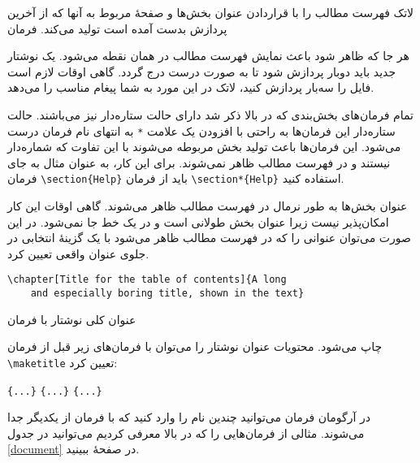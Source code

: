 لاتک فهرست مطالب را با قراردادن عنوان بخش‌ها و صفحهٔ مربوط به آنها که از آخرین پردازش بدست آمده است تولید می‌کند. فرمان
\begin{lscommand} 
\end{lscommand} 
\noindent
هر جا که ظاهر شود باعث نمایش فهرست مطالب در همان نقطه می‌شود. یک نوشتار جدید باید دوبار پردازش شود تا 
به صورت درست درج گردد. گاهی اوقات لازم است فایل را سه‌بار پردازش کنید، لاتک در این مورد به شما پیغام مناسب را می‌دهد.

تمام فرمان‌های بخش‌بندی که در بالا ذکر شد دارای حالت ستاره‌دار نیز می‌باشند. حالت ستاره‌دار این فرمان‌ها به راحتی با افزودن یک علامت 
\verb|*|
به انتهای نام فرمان درست می‌شود. این فرمان‌ها باعث تولید بخش مربوطه می‌شوند با این تفاوت که شماره‌دار نیستند و در فهرست مطالب ظاهر نمی‌شوند. 
برای این کار، به عنوان مثال به جای فرمان 
\verb|\section{Help}|
باید از فرمان  
\verb|\section*{Help}|
استفاده کنید.

عنوان بخش‌ها به طور نرمال در فهرست مطالب ظاهر می‌شوند. گاهی اوقات این کار امکان‌\-پذیر نیست زیرا عنوان بخش طولانی است و در یک خط جا نمی‌شود. در این صورت می‌توان عنوانی را که در فهرست مطالب ظاهر می‌شود با یک گزینهٔ انتخابی در جلوی عنوان واقعی تعیین کرد.
\begin{code}
\verb|\chapter[Title for the table of contents]{A long|\\
\verb|    and especially boring title, shown in the text}|
\end{code} 

عنوان کلی نوشتار با فرمان 
\begin{lscommand}
\end{lscommand}
\noindent
چاپ می‌شود. محتویات عنوان نوشتار را می‌توان با فرمان‌های زیر قبل از فرمان 
\verb|\maketitle|
تعیین کرد:
\begin{lscommand}
\verb|{...}|\lr{,} \verb|{...}| 
\lr{,} \verb|{...}| 
\end{lscommand}
\noindent
در آرگومان فرمان 
می‌توانید چندین نام را وارد کنید که با فرمان 
از یکدیگر جدا می‌شوند. مثالی از فرمان‌هایی را که در بالا معرفی کردیم می‌توانید در جدول 
\ref{document}
در صفحهٔ
\pageref{document}
ببینید.

